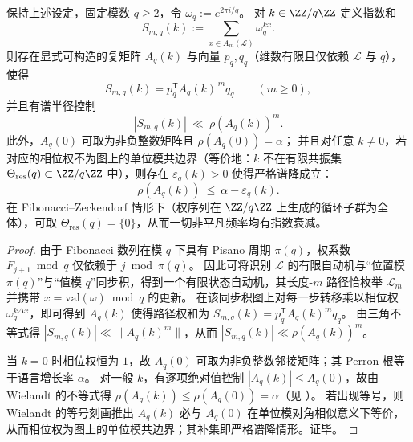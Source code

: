 \begin{theorem}\label{thm:gm-twisted-perron-fourier-decay}
保持上述设定，固定模数 \(q\ge 2\)，令 \(\omega_q:=e^{2\pi i/q}\)。
对 \(k\in\ZZ/q\ZZ\) 定义指数和
\[
S_{m,q}(k):=\sum_{x\in A_m(\mathcal{L})}\omega_q^{k x}.
\]
则存在显式可构造的复矩阵 \(A_{q}(k)\) 与向量 \(p_q,q_q\)（维数有限且仅依赖 \(\mathcal{L}\) 与 \(q\)），使得
\[
S_{m,q}(k)=p_q^{\mathsf T}A_q(k)^{\,m}q_q\qquad(m\ge 0),
\]
并且有谱半径控制
\[
|S_{m,q}(k)|\ \ll\ \rho(A_q(k))^m.
\]
此外，\(A_q(0)\) 可取为非负整数矩阵且 \(\rho(A_q(0))=\alpha\)；
并且对任意 \(k\neq 0\)，若对应的相位权不为图上的单位模共边界（等价地：\(k\) 不在有限共振集 \(\Theta_{\mathrm{res}}(q)\subset \ZZ/q\ZZ\) 中），则存在 \(\varepsilon_{q}(k)>0\) 使得严格谱降成立：
\[
\rho(A_q(k))\ \le\ \alpha-\varepsilon_q(k).
\]
在 Fibonacci--Zeckendorf 情形下（权序列在 \(\ZZ/q\ZZ\) 上生成的循环子群为全体），可取 \(\Theta_{\mathrm{res}}(q)=\{0\}\)，从而一切非平凡频率均有指数衰减。
\end{theorem}

\begin{proof}
由于 Fibonacci 数列在模 \(q\) 下具有 Pisano 周期 \(\pi(q)\)，权系数 \(F_{j+1}\bmod q\) 仅依赖于 \(j\bmod \pi(q)\)。
因此可将识别 \(\mathcal{L}\) 的有限自动机与“位置模 \(\pi(q)\)”与“值模 \(q\)”同步积，得到一个有限状态自动机，其长度-\(m\) 路径恰枚举 \(\mathcal{L}_m\) 并携带 \(x=\mathrm{val}(\omega)\bmod q\) 的更新。
在该同步积图上对每一步转移乘以相位权 \(\omega_q^{k\Delta x}\)，即可得到 \(A_q(k)\) 使得路径权和为 \(S_{m,q}(k)=p_q^{\mathsf T}A_q(k)^m q_q\)。
由三角不等式得 \(|S_{m,q}(k)|\ll \|A_q(k)^m\|\)，从而 \(|S_{m,q}(k)|\ll \rho(A_q(k))^m\)。

当 \(k=0\) 时相位权恒为 \(1\)，故 \(A_q(0)\) 可取为非负整数邻接矩阵；其 Perron 根等于语言增长率 \(\alpha\)。
对一般 \(k\)，有逐项绝对值控制 \(|A_q(k)|\le A_q(0)\)，故由 Wielandt 的不等式得 \(\rho(A_q(k))\le \rho(A_q(0))=\alpha\)（见 \cite{Wielandt1950UnzerlegbareNichtnegative}）。
若出现等号，则 Wielandt 的等号刻画推出 \(A_q(k)\) 必与 \(A_q(0)\) 在单位模对角相似意义下等价，从而相位权为图上的单位模共边界；其补集即严格谱降情形。证毕。
\end{proof}

